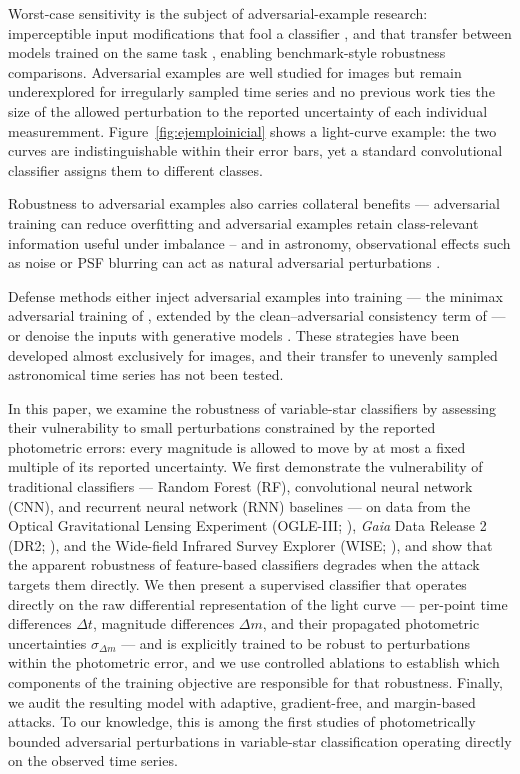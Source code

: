 \documentclass{aa}
\begin{document}
Worst-case sensitivity is the subject of adversarial-example research: imperceptible input modifications that fool a classifier \citep{goodfellow2014explaining, papernot2016distillation}, and that transfer between models trained on the same task \citep{papernot2016transferability}, enabling benchmark-style robustness comparisons. Adversarial examples are well studied for images but remain underexplored for irregularly sampled time series and no previous work ties the size of the allowed perturbation to the reported uncertainty of each individual measuremment. Figure~\ref{fig:ejemploinicial} shows a light-curve example: the two curves are indistinguishable within their error bars, yet a standard convolutional classifier assigns them to different classes.

Robustness to adversarial examples also carries collateral benefits --- adversarial training can reduce overfitting \citep{miyato2015distributional} and adversarial examples retain class-relevant information useful under imbalance \citep{ilyas2019adversarial} -- and in astronomy, observational effects such as noise or PSF blurring can act as natural adversarial perturbations \citep{ciprijanovic2021robustness}. 

Defense methods either inject adversarial examples into training --- the minimax adversarial training of \citet{madry2017towards}, extended by the clean--adversarial consistency term of \citet{zhang2019theoretically} --- or denoise the inputs with generative models \citep{samangouei2018defense, li2019defense}. These strategies have been developed almost exclusively for images, and their transfer to unevenly sampled astronomical time series has not been tested.

In this paper, we examine the robustness of variable-star classifiers by assessing their vulnerability to small perturbations constrained by the reported photometric errors: every magnitude is allowed to move by at most a fixed multiple of its reported uncertainty. We first demonstrate the vulnerability of traditional classifiers --- Random Forest (RF), convolutional neural network (CNN), and recurrent neural network (RNN) baselines --- on data from the Optical Gravitational Lensing Experiment (OGLE-III; \citealt{udalski2004optical}), \textit{Gaia} Data Release 2 (DR2; \citealt{gaia2018gaia}), and the Wide-field Infrared Survey Explorer (WISE; \citealt{wright2010wide}), and show that the apparent robustness of feature-based classifiers degrades when the attack targets them directly. We then present a supervised classifier that operates directly on the raw differential representation of the light curve --- per-point time differences $\Delta t$, magnitude differences $\Delta m$, and their propagated photometric uncertainties $\sigma_{\Delta m}$ --- and is explicitly trained to be robust to perturbations within the photometric error, and we use controlled ablations to establish which components of the training objective are responsible for that robustness. Finally, we audit the resulting model with adaptive, gradient-free, and margin-based attacks. To our knowledge, this is among the first studies of photometrically bounded adversarial perturbations in variable-star classification operating directly on the observed time series.
\end{document}
